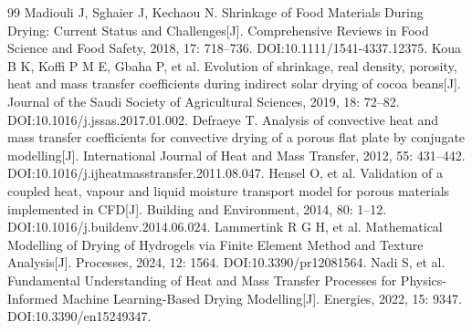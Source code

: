 \documentclass[withoutpreface,bwprint]{cumcmthesis}
\begin{document}
\begin{thebibliography}{99}
 Madiouli J, Sghaier J, Kechaou N. Shrinkage of Food Materials During Drying: Current Status and Challenges[J]. Comprehensive Reviews in Food Science and Food Safety, 2018, 17: 718--736. DOI:10.1111/1541-4337.12375.
 Koua B K, Koffi P M E, Gbaha P, et al. Evolution of shrinkage, real density, porosity, heat and mass transfer coefficients during indirect solar drying of cocoa beans[J]. Journal of the Saudi Society of Agricultural Sciences, 2019, 18: 72--82. DOI:10.1016/j.jssas.2017.01.002.
 Defraeye T. Analysis of convective heat and mass transfer coefficients for convective drying of a porous flat plate by conjugate modelling[J]. International Journal of Heat and Mass Transfer, 2012, 55: 431--442. DOI:10.1016/j.ijheatmasstransfer.2011.08.047.
 Hensel O, et al. Validation of a coupled heat, vapour and liquid moisture transport model for porous materials implemented in CFD[J]. Building and Environment, 2014, 80: 1--12. DOI:10.1016/j.buildenv.2014.06.024.
 Lammertink R G H, et al. Mathematical Modelling of Drying of Hydrogels via Finite Element Method and Texture Analysis[J]. Processes, 2024, 12: 1564. DOI:10.3390/pr12081564.
 Nadi S, et al. Fundamental Understanding of Heat and Mass Transfer Processes for Physics-Informed Machine Learning-Based Drying Modelling[J]. Energies, 2022, 15: 9347. DOI:10.3390/en15249347.
\end{thebibliography}
\end{document}
